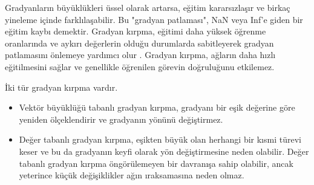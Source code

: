 Gradyanların büyüklükleri üssel olarak artarsa, eğitim kararsızlaşır ve birkaç yineleme içinde farklılaşabilir. Bu "gradyan patlaması", NaN veya Inf'e giden bir eğitim kaybı demektir. Gradyan kırpma, eğitimi daha yüksek öğrenme oranlarında ve aykırı değerlerin olduğu durumlarda sabitleyerek gradyan patlamasını önlemeye yardımcı olur \cite{trainrecneural}. Gradyan kırpma, ağların daha hızlı eğitilmesini sağlar ve genellikle öğrenilen görevin doğruluğunu etkilemez.

İki tür gradyan kırpma vardır.
\begin{itemize}
\item Vektör büyüklüğü tabanlı gradyan kırpma, gradyanı bir eşik değerine göre yeniden ölçeklendirir ve gradyanın yönünü değiştirmez.
\item Değer tabanlı gradyan kırpma, eşikten büyük olan herhangi bir kısmi türevi keser ve bu da gradyanın keyfi olarak yön değiştirmesine neden olabilir. Değer tabanlı gradyan kırpma öngörülemeyen bir davranışa sahip olabilir, ancak yeterince küçük değişiklikler ağın ıraksamasına neden olmaz.
\end{itemize}

